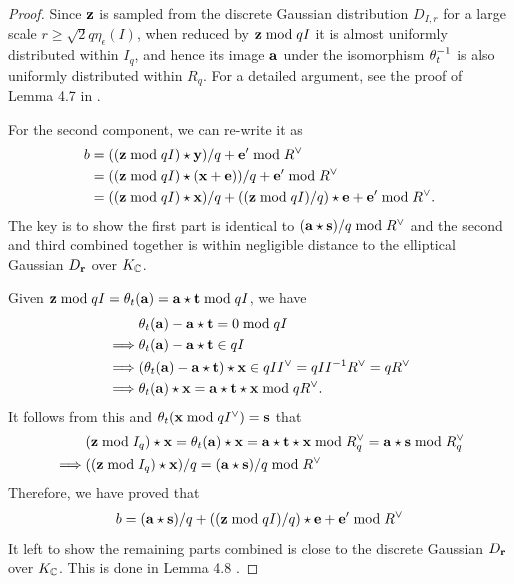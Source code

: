 \documentclass[../main.tex]{subfiles}
\begin{document}
\begin{proof}
Since $\mathbf{z}$ is sampled from the discrete Gaussian distribution $D_{I,r}$ for a large scale $r \ge \sqrt{2} q \eta_{\epsilon}(I)$, when reduced by $\mathbf{z} \bmod qI$ it is almost uniformly distributed within $I_q$, and hence its image $\mathbf{a}$ under the isomorphism $\theta^{-1}_t$ is also uniformly distributed within $R_q$. For a detailed argument, see the proof of Lemma 4.7 in \cite{lyubashevsky2010ideal}. 

For the second component, we can re-write it as 
\begin{align*}
    b &= ((\mathbf{z} \bmod qI) \star \mathbf{y})/q + \mathbf{e}' \bmod R^{\vee} \\
    &= ((\mathbf{z} \bmod qI) \star (\mathbf{x} + \mathbf{e}) )/q + \mathbf{e}' \bmod R^{\vee} \\
    &= ((\mathbf{z} \bmod qI) \star \mathbf{x})/q +  ((\mathbf{z} \bmod qI)/q) \star \mathbf{e} + \mathbf{e}' \bmod R^{\vee}. \\
\end{align*}
The key is to show the first part is identical to $(\mathbf{a} \star \mathbf{s})/q \bmod R^{\vee}$ and the second and third combined together is within negligible distance to the elliptical Gaussian $D_{\mathbf{r}}$ over $K_{\mathbb{C}}$.

Given $\mathbf{z} \bmod qI=\theta_t(\mathbf{a}) =\mathbf{a} \star \mathbf{t} \bmod qI$, we have 
\begin{align*}
    &\theta_t(\mathbf{a})-\mathbf{a} \star \mathbf{t} = 0 \bmod qI \\
    \implies &\theta_t(\mathbf{a})-\mathbf{a} \star \mathbf{t} \in qI\\
    \implies &(\theta_t(\mathbf{a})-\mathbf{a} \star \mathbf{t}) \star \mathbf{x} \in qII^{\vee}=qII^{-1}R^{\vee}=qR^{\vee} \\
    \implies &\theta_t(\mathbf{a})\star \mathbf{x} = \mathbf{a} \star \mathbf{t} \star \mathbf{x} \bmod qR^{\vee}.
\end{align*}
It follows from this and $\theta_t(\mathbf{x} \bmod qI^{\vee}) =\mathbf{s}$ that 
\begin{align*}
    &(\mathbf{z} \bmod I_q) \star \mathbf{x} = \theta_t(\mathbf{a}) \star \mathbf{x} 
    = \mathbf{a} \star \mathbf{t} \star \mathbf{x} \bmod R^{\vee}_q 
    = \mathbf{a} \star \mathbf{s} \bmod R^{\vee}_q \\
    \implies &((\mathbf{z} \bmod I_q) \star \mathbf{x}) / q = (\mathbf{a} \star \mathbf{s})/q \bmod R^{\vee}
\end{align*}
Therefore, we have proved that 
\begin{align*}
    b=(\mathbf{a} \star \mathbf{s})/q +  ((\mathbf{z} \bmod qI)/q) \star \mathbf{e} + \mathbf{e}' \bmod R^{\vee}
\end{align*}
It left to show the remaining parts combined is close to the discrete Gaussian $D_{\mathbf{r}}$ over $K_{\mathbb{C}}$. This is done in Lemma 4.8 \citep{lyubashevsky2010ideal}. %


\end{proof}
\end{document}
